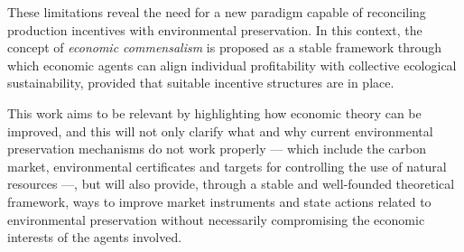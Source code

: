 These limitations reveal the need for a new paradigm capable of reconciling production incentives with environmental preservation. In this context, the concept of \textit{economic commensalism} is proposed as a stable framework through which economic agents can align individual profitability with collective ecological sustainability, provided that suitable incentive structures are in place. 

This work aims to be relevant by highlighting how economic theory can be improved, and this will not only clarify what and why current environmental preservation mechanisms do not work properly — which include the carbon market, environmental certificates and targets for controlling the use of natural resources —, but will also provide, through a stable and well-founded theoretical framework, ways to improve market instruments and state actions related to environmental preservation without necessarily compromising the economic interests of the agents involved.


\newpage

